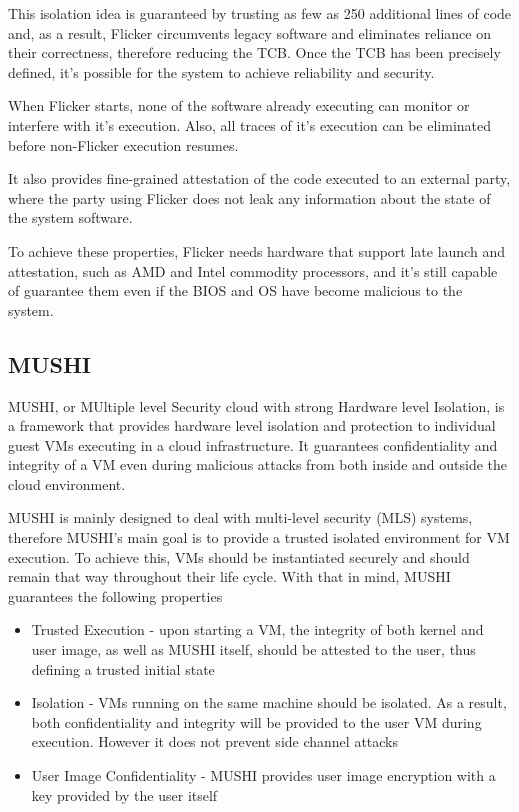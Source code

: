 This isolation idea is guaranteed by trusting as few as 250 additional lines of code and, as a result, Flicker circumvents legacy software and eliminates reliance on their correctness, therefore reducing the TCB. Once the TCB has been precisely defined, it's possible for the system to achieve reliability and security.  

When Flicker starts, none of the software already executing can monitor or interfere with it's execution. Also, all traces of it's execution can be eliminated before non-Flicker execution resumes.

It also provides fine-grained attestation of the code executed to an external party, where the party using Flicker does not leak any information about the state of the system software. 

To achieve these properties, Flicker needs hardware that support late launch and attestation, such as AMD and Intel commodity processors, and it's still capable of guarantee them even if the BIOS and OS have become malicious to the system.

\subsection{MUSHI}
\label{ssec:mushi}

MUSHI, or MUltiple level Security cloud with strong Hardware level Isolation, is a framework that provides hardware level isolation and protection to individual guest VMs executing in a cloud infrastructure. It guarantees confidentiality and integrity of a VM even during malicious attacks from both inside and outside the cloud environment.

MUSHI is mainly designed to deal with multi-level security (MLS) \cite{mlsMIT} systems, therefore MUSHI's main goal is to provide a trusted isolated environment for VM execution. To achieve this, VMs should be instantiated securely and should remain that way throughout their life cycle. With that in mind, MUSHI guarantees the following properties

\begin{itemize}
	\item Trusted Execution - upon starting a VM, the integrity of both kernel and user image, as well as MUSHI itself, should be attested to the user, thus defining a trusted initial state

	\item Isolation - VMs running on the same machine should be isolated. As a result, both confidentiality and integrity will be provided to the user VM during execution. However it does not prevent side channel attacks
	
	\item User Image Confidentiality - MUSHI provides user image encryption with a key provided by the user itself
	
\end{itemize}

